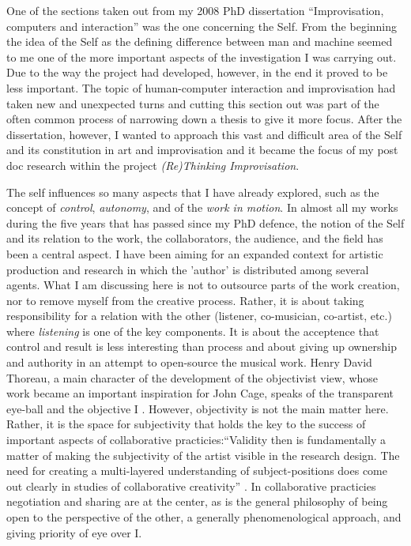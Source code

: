 \documentclass[a4paper]{article}
\begin{document}
One of the sections taken out from my 2008 PhD dissertation ``Improvisation, computers and interaction'' \cite{frisk08} was the one concerning the Self. From the beginning the idea of the Self as the defining difference between man and machine seemed to me one of the more important aspects of the investigation I was carrying out. Due to the way the project had developed, however, in the end it proved to be less important. The topic of human-computer interaction and improvisation had taken new and unexpected turns and cutting this section out was part of the often common process of narrowing down a thesis to give it more focus. After the dissertation, however, I wanted to approach this vast and difficult area of the Self and its constitution in art and improvisation and it became the focus of my post doc research within the project \emph{(Re)Thinking Improvisation}. 

The self influences so many aspects that I have already explored, such as the concept of \emph{control}, \emph{autonomy}, and of the \emph{work in motion}. In almost all my works during the five years that has passed since my PhD defence, the notion of the Self and its relation to the work, the collaborators, the audience, and the field has been a central aspect. I have been aiming for an expanded context for artistic production and research in which the 'author' is distributed among several agents.
What I am discussing here is not to outsource parts of the work creation, nor to remove myself from the creative process. Rather, it is about taking responsibility for a relation with the other (listener, co-musician, co-artist, etc.) where \emph{listening} is one of the key components. It is about the acceptence that control and result is less interesting than process and about giving up ownership and authority in an attempt to open-source the musical work. Henry David Thoreau, a main character of the development of the objectivist view, whose work became an important inspiration for John Cage, speaks of the transparent eye-ball and the objective I \cite{thoreau2004}. However, objectivity is not the main matter here. Rather, it is the space for subjectivity that holds the key to the success of important aspects of collaborative practicies:``Validity then is fundamentally a matter of making the subjectivity of the artist visible in the research design. The need for creating a multi-layered understanding of subject-positions does come out clearly in studies of collaborative creativity'' \cite{frisk-ost13}. In collaborative practicies negotiation and sharing are at the center, as is the general philosophy of being open to the perspective of the other, a generally phenomenological approach, and giving priority of eye over I. 
\end{document}
